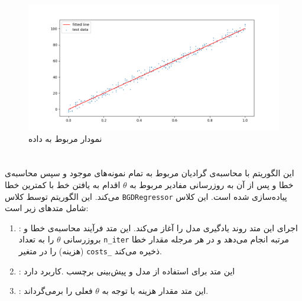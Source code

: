 \documentclass[]{article}
\begin{document}
\begin{figure}
	\centering
	\includegraphics[width=1\linewidth]{lstsq-test}
	\caption{نمودار مربوط به داده }
	\label{fig:lstsq-test}
\end{figure}


\part{}

این الگوریتم با محاسبه‌ی گرادیان مربوط به تمام نمونه‌های موجود و سپس محاسبه‌ی خطا و پس از آن به روزرسانی مفادیر مربوط به $\theta$ اقدام به یافتن خط با کمترین خطا می‌کند. این الگوریتم توسط کلاس \texttt{BGDRegressor} پیاده‌سازی شده است. این کلاس شامل متدهای زیر است:

\begin{enumerate}
	\item {}: اجرای این متد روند یادگیری مدل را آغاز می‌کند. این متد فرآیند محاسبه‌ی خطا و بروزرسانی $\theta$ را به تعداد \texttt{n_iter} مرتبه انجام می‌دهد و در هر مرجله مقدار خطا (هزینه) را در متغیر \texttt{costs_} ذخیره می‌کند.
	\item {}: این متد برای استفاده از مدل و پیش‌بینی برچسب .کاربرد دارد
	\item {}: این متد مقدار هزینه‌ با توجه به $\theta$ فعلی را برمی‌گرداند.
\end{enumerate}
\end{document}
